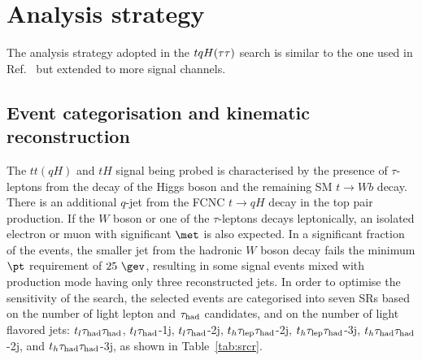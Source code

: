 \section{Analysis strategy}
\label{sec:strategy_Htautau}

The analysis strategy adopted in the $tqH(\tau\tau)$ search is similar to the one used in Ref.~\cite{fcnc36,Chen:2015nta} but extended to more signal channels.

\subsection{Event categorisation and kinematic reconstruction}
\label{sec:htautau_reco_cat}

The $tt(qH)$ and $tH$ signal being probed is characterised by the presence of $\tau$-leptons from the decay of 
the Higgs boson and the remaining SM $t\to Wb$ decay. There is an additional $q$-jet from the FCNC $t\to qH$ decay in the top pair production. 
If the $W$ boson or one of the $\tau$-leptons decays leptonically, an isolated electron or muon with significant $\met$ is also expected.
In a significant fraction of the events, the smaller jet from the hadronic $W$ boson decay fails the minimum $\pt$ requirement of $25~\gev$,
resulting in some signal events mixed with production mode having only three reconstructed jets.
In order to optimise the sensitivity of the search, the selected events are categorised into seven SRs based on the number of light lepton and
$\tau_{\mathrm{had}}$ candidates, and on the number of light flavored jets:
$t_l\tau_{\mathrm{had}} \tau_{\mathrm{had}}$, $t_l\tau_{\mathrm{had}}$-1j, $t_l\tau_{\mathrm{had}}$-2j, $t_h\tau_{\mathrm{lep}} \tau_{\mathrm{had}}$-2j, $t_h\tau_{\mathrm{lep}} \tau_{\mathrm{had}}$-3j, $t_h\tau_{\mathrm{had}} \tau_{\mathrm{had}}$-2j, and $t_h\tau_{\mathrm{had}} \tau_{\mathrm{had}}$-3j, as shown in Table~\ref{tab:srcr}. 

